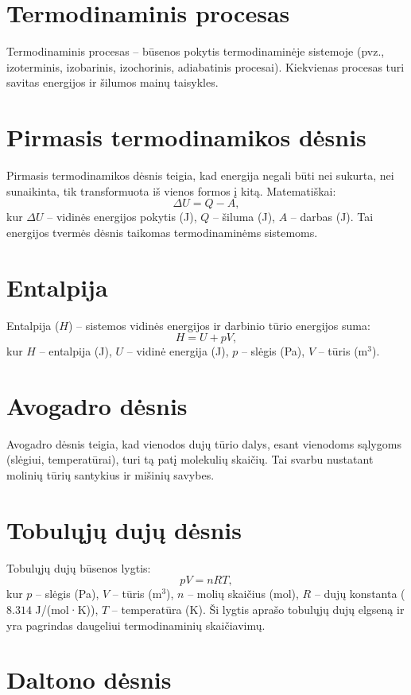 \documentclass[a4paper,12pt]{article}
\begin{document}
\section{Termodinaminis procesas}

Termodinaminis procesas – būsenos pokytis termodinaminėje sistemoje (pvz., izoterminis, izobarinis, izochorinis, adiabatinis procesai). Kiekvienas procesas turi savitas energijos ir šilumos mainų taisykles.

\section{Pirmasis termodinamikos dėsnis}

Pirmasis termodinamikos dėsnis teigia, kad energija negali būti nei sukurta, nei sunaikinta, tik transformuota iš vienos formos į kitą. Matematiškai: 
\[
\Delta U = Q - A,
\]
kur $\Delta U$ – vidinės energijos pokytis (J), $Q$ – šiluma (J), $A$ – darbas (J). Tai energijos tvermės dėsnis taikomas termodinaminėms sistemoms.

\section{Entalpija}

Entalpija ($H$) – sistemos vidinės energijos ir darbinio tūrio energijos suma: 
\[
H = U + pV,
\]
kur $H$ – entalpija (J), $U$ – vidinė energija (J), $p$ – slėgis (Pa), $V$ – tūris (m\(^3\)).

\section{Avogadro dėsnis}

Avogadro dėsnis teigia, kad vienodos dujų tūrio dalys, esant vienodoms sąlygoms (slėgiui, temperatūrai), turi tą patį molekulių skaičių. Tai svarbu nustatant molinių tūrių santykius ir mišinių savybes.

\section{Tobulųjų dujų dėsnis}

Tobulųjų dujų būsenos lygtis:
\[
pV = nRT,
\]
kur $p$ – slėgis (Pa), $V$ – tūris (m\(^3\)), $n$ – molių skaičius (mol), $R$ – dujų konstanta ($8.314$ J/(mol·K)), $T$ – temperatūra (K). Ši lygtis aprašo tobulųjų dujų elgseną ir yra pagrindas daugeliui termodinaminių skaičiavimų.

\section{Daltono dėsnis}
\end{document}
